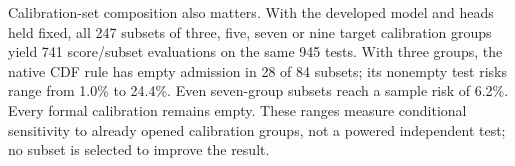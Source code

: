 Calibration-set composition also matters. With the developed model and heads held fixed, all 247 subsets of three, five, seven or nine target calibration groups yield 741 score/subset evaluations on the same 945 tests. With three groups, the native CDF rule has empty admission in 28 of 84 subsets; its nonempty test risks range from 1.0\% to 24.4\%. Even seven-group subsets reach a sample risk of 6.2\%. Every formal calibration remains empty. These ranges measure conditional sensitivity to already opened calibration groups, not a powered independent test; no subset is selected to improve the result.
